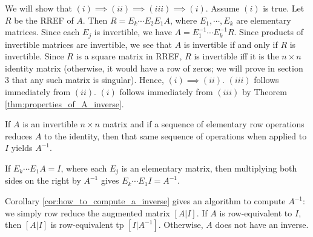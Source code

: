 \documentclass[12pt,letterpaper,reqno]{article}
\numberwithin{equation}{section}
\newcommand{\fixme}[1]{{\color{orange}{[#1]}}}
\begin{document}
\begin{pf}
We will show that $(i) \implies (ii) \implies (iii) \implies (i)$. Assume $(i)$ is true. Let $R$ be the RREF of $A$. Then $R=E_k\cdots E_2 E_1 A$, where $E_1,\cdots,E_k$ are elementary matrices. Since each $E_j$ is invertible, we have $A=E_1^{-1} \cdots E_k^{-1}R$. Since products of invertible matrices are invertible, we see that $A$ is invertible if and only if $R$ is invertible. Since $R$ is a square matrix in RREF, $R$ is invertible iff it is the $n \times n$ identity matrix (otherwise, it would have a row of zeros; we will prove in section 3 \fixme{Add link.} that any such matrix is singular). Hence, $(i) \implies (ii)$. $(iii)$ follows immediately from $(ii)$. $(i)$ follows immediately from $(iii)$ by Theorem \ref{thm:properties_of_A_inverse}.	
\end{pf}

\begin{cor}\label{cor:how_to_compute_a_inverse}
If $A$ is an invertible $n \times n$ matrix and if a sequence of elementary row operations reduces $A$ to the identity, then that same sequence of operations when applied to $I$ yields $A^{-1}$.	
\end{cor}

\begin{pf}
If $E_k \cdots E_1 A=I$, where each $E_j$ is an elementary matrix, then multiplying both sides on the right by $A^{-1}$ gives $E_k \cdots E_1 I=A^{-1}$.	
\end{pf}

Corollary \ref{cor:how_to_compute_a_inverse} gives an algorithm to compute $A^{-1}$: we simply row reduce the augmented matrix $[A|I]$. If $A$ is row-equivalent to $I$, then $[A|I]$ is row-equivalent tp $[I|A^{-1}]$. Otherwise, $A$ does not have an inverse.
\end{document}
